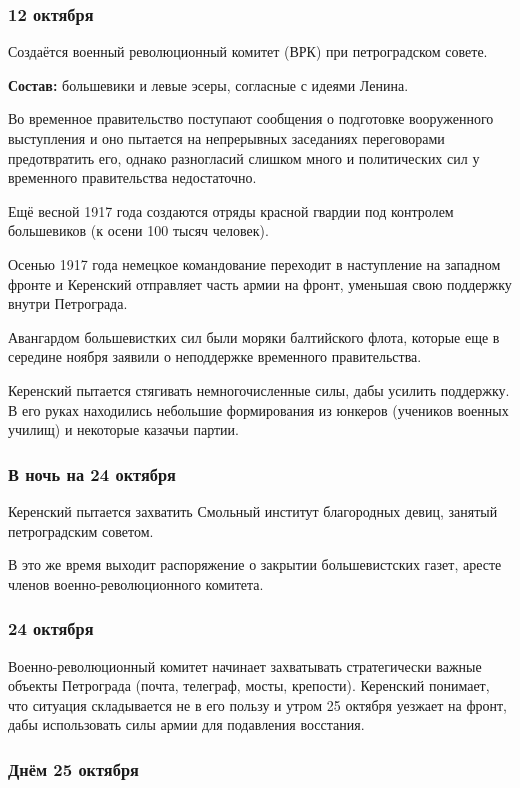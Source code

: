 \subsubsection{\textbf{12 октября}}
Создаётся военный революционный комитет (ВРК) при петроградском совете.

\textbf{Состав:} большевики и левые эсеры, согласные с идеями Ленина.

Во временное правительство поступают сообщения о подготовке вооруженного выступления и оно пытается на непрерывных заседаниях переговорами предотвратить его, однако разногласий слишком много и политических сил у временного правительства недостаточно. 

Ещё весной 1917 года создаются отряды красной гвардии под контролем большевиков (к осени 100 тысяч человек).

Осенью 1917 года немецкое командование переходит в наступление на западном фронте и Керенский отправляет часть армии на фронт, уменьшая свою поддержку внутри Петрограда. 

Авангардом большевистких сил были моряки балтийского флота, которые еще в середине ноября заявили о неподдержке временного правительства.

Керенский пытается стягивать немногочисленные силы, дабы усилить поддержку. В его руках находились небольшие формирования из юнкеров (учеников военных училищ) и некоторые казачьи партии.

\subsubsection{\textbf{В ночь на 24 октября}}

Керенский пытается захватить Смольный институт благородных девиц, занятый петроградским советом.

В это же время выходит распоряжение о закрытии большевистских газет, аресте членов военно-революционного комитета.

\subsubsection{\textbf{24 октября}}

Военно-революционный комитет начинает захватывать стратегически важные объекты Петрограда (почта, телеграф, мосты, крепости). Керенский понимает, что ситуация складывается не в его пользу и утром 25 октября уезжает на фронт, дабы использовать силы армии для подавления восстания.

\subsubsection{\textbf{Днём 25 октября}}

